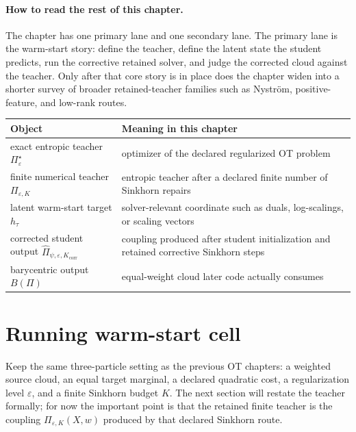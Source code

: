 \paragraph{How to read the rest of this chapter.}
The chapter has one primary lane and one secondary lane.  The primary lane is the
warm-start story: define the teacher, define the latent state the student predicts,
run the corrective retained solver, and judge the corrected cloud against the
teacher.  Only after that core story is in place does the chapter widen into a
shorter survey of broader retained-teacher families such as Nystr{\"o}m,
positive-feature, and low-rank routes.

\begin{center}
\small
\begin{tabular}{p{} p{}}
\toprule
Object & Meaning in this chapter \\
\midrule
exact entropic teacher \(\Pi_\varepsilon^\star\) & optimizer of the declared regularized OT problem \\
finite numerical teacher \(\Pi_{\varepsilon,K}\) & entropic teacher after a declared finite number of Sinkhorn repairs \\
latent warm-start target \(h_\tau\) & solver-relevant coordinate such as duals, log-scalings, or scaling vectors \\
corrected student output \(\widehat\Pi_{\psi,\varepsilon,K_{\mathrm{corr}}}\) & coupling produced after student initialization and retained corrective Sinkhorn steps \\
barycentric output \(B(\Pi)\) & equal-weight cloud later code actually consumes \\
\bottomrule
\end{tabular}
\end{center}

\section{Running warm-start cell}
\label{sec:bf-learned-ot-running-cell}

Keep the same three-particle setting as the previous OT chapters: a weighted
source cloud, an equal target marginal, a declared quadratic cost, a
regularization level \(\varepsilon\), and a finite Sinkhorn budget \(K\).  The
next section will restate the teacher formally; for now the important point is
that the retained finite teacher is the coupling
\(\Pi_{\varepsilon,K}(X,w)\) produced by that declared Sinkhorn route.


